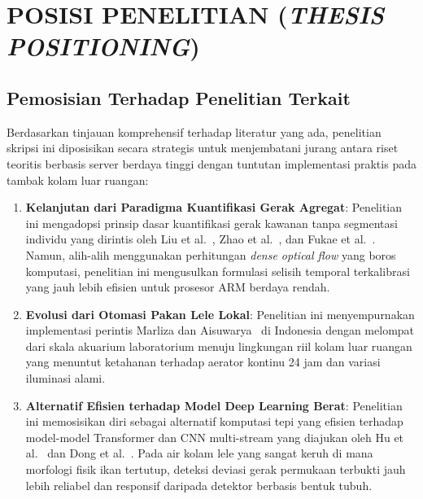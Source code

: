 \section{POSISI PENELITIAN (\textit{THESIS POSITIONING})}
\label{sec:positioning}

\subsection{Pemosisian Terhadap Penelitian Terkait}
Berdasarkan tinjauan komprehensif terhadap literatur yang ada, penelitian skripsi ini diposisikan secara strategis untuk menjembatani jurang antara riset teoritis berbasis server berdaya tinggi dengan tuntutan implementasi praktis pada tambak kolam luar ruangan:
\begin{enumerate}
    \item \textbf{Kelanjutan dari Paradigma Kuantifikasi Gerak Agregat}: Penelitian ini mengadopsi prinsip dasar kuantifikasi gerak kawanan tanpa segmentasi individu yang dirintis oleh Liu et al.~\cite{Liu2014}, Zhao et al.~\cite{Zhao2016}, dan Fukae et al.~\cite{Fukae2023}. Namun, alih-alih menggunakan perhitungan \textit{dense optical flow} yang boros komputasi, penelitian ini mengusulkan formulasi selisih temporal terkalibrasi yang jauh lebih efisien untuk prosesor ARM berdaya rendah.
    \item \textbf{Evolusi dari Otomasi Pakan Lele Lokal}: Penelitian ini menyempurnakan implementasi perintis Marliza dan Aisuwarya~\cite{Marliza2021} di Indonesia dengan melompat dari skala akuarium laboratorium menuju lingkungan riil kolam luar ruangan yang menuntut ketahanan terhadap aerator kontinu 24 jam dan variasi iluminasi alami.
    \item \textbf{Alternatif Efisien terhadap Model Deep Learning Berat}: Penelitian ini memosisikan diri sebagai alternatif komputasi tepi yang efisien terhadap model-model Transformer dan CNN multi-stream yang diajukan oleh Hu et al.~\cite{Hu2026} dan Dong et al.~\cite{Dong2024}. Pada air kolam lele yang sangat keruh di mana morfologi fisik ikan tertutup, deteksi deviasi gerak permukaan terbukti jauh lebih reliabel dan responsif daripada detektor berbasis bentuk tubuh.
\end{enumerate}

